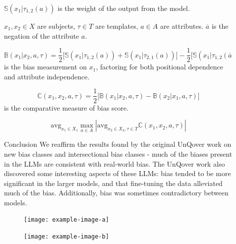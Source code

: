 \documentclass[final]{beamer}
\newlength{\sepwid}
\newlength{\onecolwid}
\newcommand{\avg}{\text{avg}}
\begin{document}
\begin{frame}[t]
\begin{columns}[t]
\begin{column}{\onecolwid}
    \end{column}
        
    \begin{column}{\sepwid}  \end{column}

    \begin{column}{\onecolwid} %
      
      \begin{block}{\vspace*{2.7cm}}
        $\mathbb{S}(x_1|\tau_{1, 2}(a))$ is the weight of the output from the model.

        $x_1, x_2 \in X$ are subjects, $\tau \in T$ are templates, $a \in A$ are attributes.
        $\overline{a}$ is the negation of the attribute $a$.

        \[
        \mathbb{B}(x_1 | x_2, a, \tau) = \frac{1}{2} \big[ \mathbb{S}(x_1 | \tau_{1, 2}(a)) + \mathbb{S}(x_1 | \tau_{2, 1}(a)) \big] - \frac{1}{2} \big[ \mathbb{S}(x_1 | \tau_{1, 2}(\overline{a})) + \mathbb{S}(x_1 | \tau_{2, 1}(\overline{a})) \big]
        \]
        is the bias measurement on $x_1$, factoring for both positional dependence and attribute independence.

        \[
        \mathbb{C}(x_1, x_2, a, \tau) = \frac{1}{2} \big[ \mathbb{B}(x_1 | x_2, a, \tau) - \mathbb{B} (x_2 | x_1, a, \tau) \big]
        \]
        is the comparative measure of bias score. 

        \[
        \avg_{x_1 \in X_1} \max_{a \in A} | \avg_{x_2 \in X_2, \tau \in T} \mathbb{C}(x_1, x_2, a, \tau) |
        \]

      \end{block}
      
      
      \begin{block}{Conclusion}
        We reaffirm the results found by the original UnQover work on new bias classes and intersectional bias classes - much of the biases present in the LLMs are consistent with real-world bias. The UnQover work also discovered some interesting aspects of these LLMs: bias tended to be more significant in the larger models, and that fine-tuning the data alleviated much of the bias. Additionally, bias was sometimes contradictory between models.
      \end{block}


      
      \begin{block}{ }
	\begin{figure}
          \vspace*{-1cm}
          \texttt{[image: example-image-a]}
	\end{figure}
	\begin{figure}
          \texttt{[image: example-image-b]}
	\end{figure}
        

\end{block}
\end{column}
\end{columns}
\end{frame}
\end{document}
